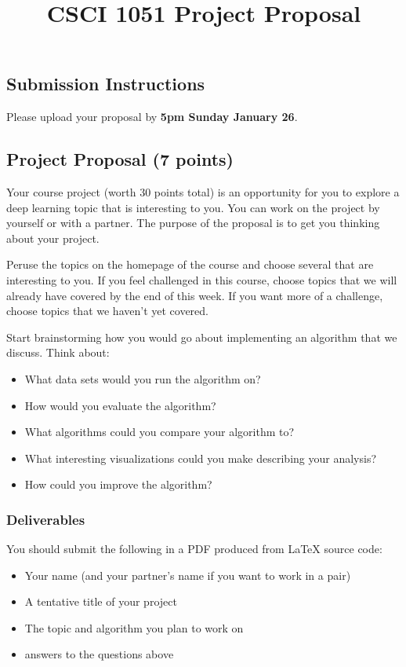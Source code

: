 \documentclass{article}
\title{CSCI 1051 Project Proposal}
\author{} %
\date{}
\begin{document}
\maketitle

\subsection*{Submission Instructions}
Please upload your proposal by \textbf{5pm Sunday January 26}.

\subsection*{Project Proposal (7 points)}

Your course project (worth 30 points total) is an opportunity
for you to explore a deep learning topic that is
interesting to you.
You can work on the project by yourself or with a partner.
The purpose of the proposal is to get you thinking 
about your project.

Peruse the topics on the homepage of the course and choose several that are interesting to you.
If you feel challenged in this course, choose topics that we will already have covered by the end of this week.
If you want more of a challenge, choose topics that we haven't yet covered.

Start brainstorming how you would go about implementing an algorithm that we discuss.
Think about:
\begin{itemize}
    \item What data sets would you run the algorithm on?
    \item How would you evaluate the algorithm?
    \item What algorithms could you compare your algorithm to?
    \item What interesting visualizations could you make describing your analysis?
    \item How could you improve the algorithm?
\end{itemize}

\subsubsection*{Deliverables}

You should submit the following in a PDF produced from
LaTeX source code:
\begin{itemize}
    \item Your name (and your partner's name if you want to work in a pair)
    \item A tentative title of your project
    \item The topic and algorithm you plan to work on
    \item answers to the questions above 
\end{itemize}
\end{document}
